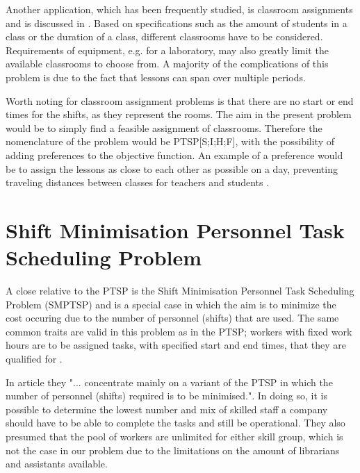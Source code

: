 Another application, which has been frequently studied, is classroom assignments and is discussed in \citet{krishnamoorthy_2001}. Based on specifications such as the amount of students in a class or the duration of a class, different classrooms have to be considered. Requirements of equipment, e.g. for a laboratory, may also greatly limit the available classrooms to choose from. A majority of the complications of this problem is due to the fact that lessons can span over multiple periods. 

Worth noting for classroom assignment problems is that there are no start or end times for the shifts, as they represent the rooms. The aim in the present problem would be to simply find a feasible assignment of classrooms. Therefore the nomenclature of the problem would be PTSP[S;I;H;F], with the possibility of adding preferences to the objective function. An example of a preference would be to assign the lessons as close to each other as possible on a day, preventing traveling distances between classes for teachers and students \citet{krishnamoorthy_2001}.



%
%



\section{Shift Minimisation Personnel Task Scheduling Problem}\label{SMTSP}

A close relative to the PTSP is the Shift Minimisation Personnel Task Scheduling Problem (SMPTSP) and is a special case in which the aim is to minimize the cost occuring due to the number of personnel (shifts) that are used. The same common traits are valid in this problem as in the PTSP; workers with fixed work hours are to be assigned tasks, with specified start and end times, that they are qualified for \citet{krishnamoorthy_2012}.

In article \citet{krishnamoorthy_2012} they "... concentrate mainly on a variant of the PTSP in which the number of personnel (shifts) required is to be minimised.". In doing so, it is possible to determine the lowest number and mix of skilled staff a company should have to be able to complete the tasks and still be operational. They also presumed that the pool of workers are unlimited for either skill group, which is not the case in our problem due to the limitations on the amount of librarians and assistants available. 

